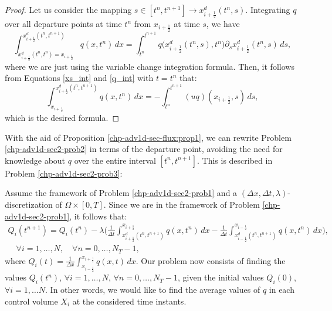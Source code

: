 \begin{proof}
	Let us consider the mapping $s\in[t^n,t^{n+1}] \to  x_{i+\frac{1}{2}}^d(t^n,s)$. 
	Integrating $q$ over all departure points at time $t^n$ from $x_{i+\frac{1}{2}}$ at time $s$, we have
	\begin{equation}
		\label{depint_1}
		\int^{ x_{i+\frac{1}{2}}^d(t^n,t^{n+1})}_{ x_{i+\frac{1}{2}}^d(t^n,t^{n}) = x_{i+\frac{1}{2}}}   
		q(x,t^n)\,dx 
		= \int_{t^n}^{t^{n+1}}  q\big( x_{i+\frac{1}{2}}^d(t^n,s),t^n\big){\partial_s}{ x_{i+\frac{1}{2}}^d} (t^n,s)\,ds,
	\end{equation}
	where we are just using the variable change integration formula.
	Then, it follows from Equations  \eqref{xs_int}
	and \eqref{q_int} with $t=t^n$ that:
	\begin{equation}
		\label{depint_2}
			\int^{ x_{i+\frac{1}{2}}^d(t^n,t^{n+1})}_{x_{i+\frac{1}{2}}} q(x,t^n)\,dx 
			= -\int_{t^n}^{t^{n+1}} ({u} q)(x_{i+\frac{1}{2}},s) \,ds, 
	\end{equation}
	which is the desired formula.
\end{proof}
With the aid of Proposition \ref{chp-adv1d-sec-flux:prop1}, we can rewrite Problem \ref{chp-adv1d-sec2-prob2}
in terms of the departure point, avoiding the need for knowledge about $q$ over the
entire interval $[t^n, t^{n+1}]$. This is described in Problem \ref{chp-adv1d-sec2-prob3}:
\begin{prob}
    \label{chp-adv1d-sec2-prob3}
	Assume the framework of Problem \ref{chp-adv1d-sec2-prob1}
    and a $(\Delta x, \Delta t, \lambda)$-discretization of $\Omega \times [0,T]$.
	Since we are in the framework of Problem \ref{chp-adv1d-sec2-prob1}, it follows that:
\begin{equation}
	\label{1d-fvslexact-scheme}
	\begin{split}
{Q}_i(t^{n+1}) =  {Q}_i(t^{n}) -
\lambda
\bigg( \frac{1}{\Delta t}\int_{x_{i+\frac{1}{2}}^d(t^n,t^{n+1})}^{x_{i+\frac{1}{2}}}{q}(x, t^n) \,dx-
\frac{1}{\Delta t} \int_{x_{i-\frac{1}{2}}^d(t^n,t^{n+1})}^{x_{i-\frac{1}{2}}}{q}(x, t^n) \,dx \bigg),\\
\quad \forall i = 1, \ldots, N,
\quad \forall n = 0, \ldots, N_T-1,
	\end{split}
\end{equation}
	where ${Q}_i(t) = \frac{1}{\Delta x}
	\int_{x_{i-\frac{1}{2}}}^{x_{i+\frac{1}{2}}} {q}(x,t) \,dx$.
	Our problem now consists of finding the values ${Q}_i(t^{n})$, 
	$\forall i = 1, \ldots, N$, $\forall n = 0, \ldots, N_T-1$,
	given the initial values ${Q}_i(0)$, $\forall i = 1, \ldots N$.
	In other words, we would like to find the average values of ${q}$
	in each control volume $X_i$ at the considered time instants.
\end{prob}
